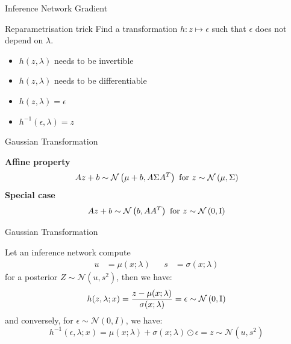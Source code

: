 \documentclass[14pt]{beamer}
\begin{document}
\begin{frame}{Inference Network Gradient}
\begin{block}{Reparametrisation trick}
Find a transformation $ h: z \mapsto \epsilon $ such that $ \epsilon $ does not depend on $ \lambda $.
\begin{itemize}
\item $ h(z, \lambda) $ needs to be invertible
\item $ h(z, \lambda) $ needs to be differentiable
\pause
\item $ h(z, \lambda) = \epsilon $
\item $ h^{-1}(\epsilon, \lambda) = z $ 
\end{itemize}
\end{block}
\end{frame}

\begin{frame}{Gaussian Transformation}

\textbf{Affine property}
\begin{equation*}
Az + b \sim \mathcal{N}\left(\mu + b,A\Sigma A^{T}\right) \text{ for } z \sim \mathcal{N}\left(\mu,\Sigma\right)
\end{equation*}
\pause
\textbf{Special case}
\begin{equation*}
Az + b \sim \mathcal{N}\left(b,A A^{T}\right) \text{ for } z \sim \mathcal{N}\left(0,\operatorname{I}\right)
\end{equation*}

\end{frame}

\begin{frame}{Gaussian Transformation}

Let an inference network compute
\begin{equation*}
\begin{aligned}
u &= \mu(x;\lambda) & & s&= \sigma(x;\lambda)
\end{aligned}
\end{equation*}
for a posterior $Z \sim \mathcal N(u, s^2)$, then we have: \pause
\begin{equation*}
h(z, \lambda; x) = \frac{z - \mu(x;\lambda)}{ \sigma(x; \lambda) } = \epsilon \sim \mathcal{N}\left(0,\operatorname{I}\right) 
\end{equation*} \pause
and conversely, for $\epsilon \sim \mathcal N(0, I)$, we have:
\begin{equation*}
h^{-1}(\epsilon, \lambda; x) = \mu(x;\lambda) + \sigma(x; \lambda) \odot \epsilon = z  \sim \mathcal N(u, s^2)
\end{equation*}

\end{frame}
\end{document}
